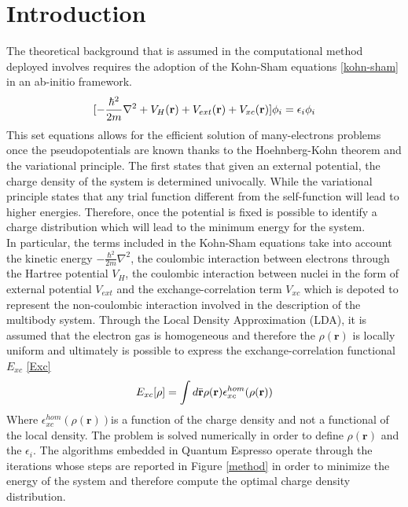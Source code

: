 \documentclass[
	12pt, %
]{fphw}
\begin{document}
\section*{Introduction}
The theoretical background that is assumed in the computational method deployed involves requires the adoption of the Kohn-Sham equations \ref{kohn-sham} in an ab-initio framework. 
\begin{equation}{\label{kohn-sham}}
	[-\frac{\hbar^2}{2m}\nabla^2 + V_{H}(\mathbf{r}) + V_{ext}(\mathbf{r}) + V_{xc}(\mathbf{r})]\phi_{i} = \epsilon_{i}\phi_{i}
\end{equation}
This set equations allows for the efficient solution of many-electrons problems once the pseudopotentials are known thanks to the Hoehnberg-Kohn theorem and the variational principle. 
The first states that given an external potential, the charge density of the system is determined univocally. 
While the variational principle states that any trial function different from the self-function will lead to higher energies. 
Therefore, once the potential is fixed is possible to identify a charge distribution which will lead to the minimum energy for the system. 
\medskip
\\
In particular, the terms included in the Kohn-Sham equations take into account the kinetic energy $-\frac{\hbar^2}{2m}\nabla^2 $, the coulombic interaction between electrons through the Hartree potential $V_{H} $, the coulombic interaction between nuclei in the form of external potential $ V_{ext} $ and the exchange-correlation term $ V_{xc} $ which is depoted to represent the non-coulombic interaction involved in the description of the multibody system.
Through the Local Density Approximation (LDA), it is assumed that the electron gas is homogeneous and therefore the $\rho(\mathbf{r}) $ is locally uniform and ultimately is possible to express the exchange-correlation functional $E_{xc} $ \ref{Exc}
\begin{equation}{\label{Exc}}
	E_{xc}[\rho]= \int d\bar{\mathbf{r}} \rho(\mathbf{r}) \epsilon_{xc}^{hom}(\rho(\mathbf{r}))
\end{equation}
Where $ \epsilon_{xc}^{hom}(\rho(\mathbf{r})) $is a function of the charge density and not a functional of the local density.
The problem is solved numerically in order to define $\rho(\mathbf{r}) $ and the $ \epsilon_{i} $.
The algorithms embedded in Quantum Espresso operate through the iterations whose steps are reported in Figure \ref{method} in order to minimize the energy of the system and therefore compute the optimal charge density distribution.
\end{document}
